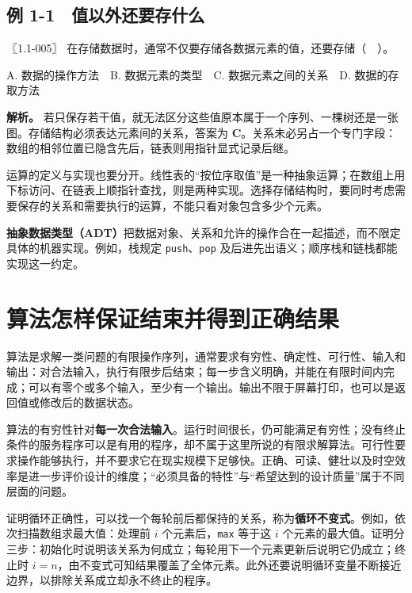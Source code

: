 \subsection{例 1-1　值以外还要存什么}\label{DS01-ex1}

\begin{example}[配套例题]

〖1.1-005〗 在存储数据时，通常不仅要存储各数据元素的值，还要存储（　）。

A. 数据的操作方法　B. 数据元素的类型　C. 数据元素之间的关系　D. 数据的存取方法

\end{example}

\textbf{解析。} 若只保存若干值，就无法区分这些值原本属于一个序列、一棵树还是一张图。存储结构必须表达元素间的关系，答案为 \textbf{C}。关系未必另占一个专门字段：数组的相邻位置已隐含先后，链表则用指针显式记录后继。

运算的定义与实现也要分开。线性表的``按位序取值''是一种抽象运算；在数组上用下标访问、在链表上顺指针查找，则是两种实现。选择存储结构时，要同时考虑需要保存的关系和需要执行的运算，不能只看对象包含多少个元素。

\textbf{抽象数据类型（ADT）}把数据对象、关系和允许的操作合在一起描述，而不限定具体的机器实现。例如，栈规定 \texttt{push}、\texttt{pop} 及后进先出语义；顺序栈和链栈都能实现这一约定。

\section{算法怎样保证结束并得到正确结果}\label{DS01-02}

算法是求解一类问题的有限操作序列，通常要求有穷性、确定性、可行性、输入和输出：对合法输入，执行有限步后结束；每一步含义明确，并能在有限时间内完成；可以有零个或多个输入，至少有一个输出。输出不限于屏幕打印，也可以是返回值或修改后的数据状态。

算法的有穷性针对\textbf{每一次合法输入}。运行时间很长，仍可能满足有穷性；没有终止条件的服务程序可以是有用的程序，却不属于这里所说的有限求解算法。可行性要求操作能够执行，并不要求它在现实规模下足够快。正确、可读、健壮以及时空效率是进一步评价设计的维度；``必须具备的特性''与``希望达到的设计质量''属于不同层面的问题。

证明循环正确性，可以找一个每轮前后都保持的关系，称为\textbf{循环不变式}。例如，依次扫描数组求最大值：处理前 \(i\) 个元素后，\texttt{max} 等于这 \(i\) 个元素的最大值。证明分三步：初始化时说明该关系为何成立；每轮用下一个元素更新后说明它仍成立；终止时 \(i=n\)，由不变式可知结果覆盖了全体元素。此外还要说明循环变量不断接近边界，以排除关系成立却永不终止的程序。

